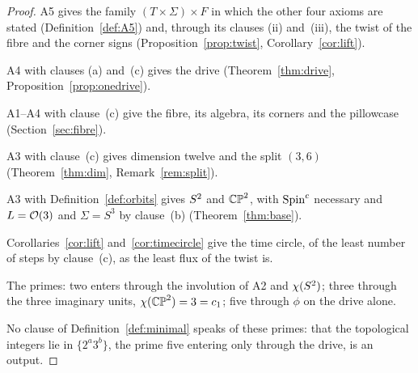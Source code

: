 \documentclass[11pt,a4paper]{article}
\theoremstyle{plain}
\theoremstyle{definition}
\theoremstyle{remark}
\begin{document}
\begin{proof}
A5 gives the family $(T\times\Sigma)\times F$ in which the other four axioms are stated (Definition~\ref{def:A5}) and, through its clauses (ii) and~(iii), the twist of the fibre and the corner signs (Proposition~\ref{prop:twist}, Corollary~\ref{cor:lift}).

A4 with clauses (a) and~(c) gives the drive (Theorem~\ref{thm:drive}, Proposition~\ref{prop:onedrive}).

A1--A4 with clause~(c) give the fibre, its algebra, its corners and the pillowcase (Section~\ref{sec:fibre}).

A3 with clause~(c) gives dimension twelve and the split $(3,6)$ (Theorem~\ref{thm:dim}, Remark~\ref{rem:split}).

A3 with Definition~\ref{def:orbits} gives $S^2$ and $\mathbb{CP}^2$, with $\text{Spin}^c$ necessary and $L=\mathcal{O}(3)$ and $\Sigma=S^{3}$ by clause~(b) (Theorem~\ref{thm:base}).

Corollaries~\ref{cor:lift} and~\ref{cor:timecircle} give the time circle, of the least number of steps by clause~(c), as the least flux of the twist is.

The primes: two enters through the involution of A2 and $\chi(S^2)$; three through the three imaginary units, $\chi(\mathbb{CP}^2)=3=c_{1}$; five through $\phi$ on the drive alone.

No clause of Definition~\ref{def:minimal} speaks of these primes: that the topological integers lie in $\{2^{a}3^{b}\}$, the prime five entering only through the drive, is an output.
\end{proof}
\end{document}
